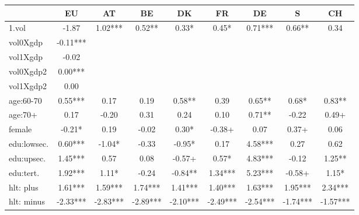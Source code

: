 {
\def\sym#1{\ifmmode^{#1}\else\(^{#1}\)\fi}
\begin{tabular}{l*{8}{c}}
\hline\hline
            &\multicolumn{1}{c}{EU}&\multicolumn{1}{c}{AT}&\multicolumn{1}{c}{BE}&\multicolumn{1}{c}{DK}&\multicolumn{1}{c}{FR}&\multicolumn{1}{c}{DE}&\multicolumn{1}{c}{S}&\multicolumn{1}{c}{CH}\\
\hline
1.vol       &       -1.87   &        1.02***&        0.52** &        0.33*  &        0.45*  &        0.71***&        0.66** &        0.34   \\
vol0Xgdp    &       -0.11***&               &               &               &               &               &               &               \\
vol1Xgdp    &       -0.02   &               &               &               &               &               &               &               \\
vol0Xgdp2   &        0.00***&               &               &               &               &               &               &               \\
vol1Xgdp2   &        0.00   &               &               &               &               &               &               &               \\
age:60-70   &        0.55***&        0.17   &        0.19   &        0.58** &        0.39   &        0.65** &        0.68*  &        0.83** \\
age:70+     &        0.17   &       -0.20   &        0.31   &        0.24   &        0.10   &        0.71** &       -0.22   &        0.49+  \\
female      &       -0.21*  &        0.19   &       -0.02   &        0.30*  &       -0.38+  &        0.07   &        0.37+  &        0.06   \\
edu:lowsec. &        0.60***&       -1.04*  &       -0.33   &       -0.95*  &        0.17   &        4.58***&        0.27   &        0.62   \\
edu:upsec.  &        1.45***&        0.57   &        0.08   &       -0.57+  &        0.57*  &        4.83***&       -0.12   &        1.25** \\
edu:tert.   &        1.92***&        1.11*  &       -0.24   &       -0.84** &        1.34***&        5.23***&       -0.58+  &        1.15*  \\
hlt: plus   &        1.61***&        1.59***&        1.74***&        1.41***&        1.40***&        1.63***&        1.95***&        2.34***\\
hlt: minus  &       -2.33***&       -2.83***&       -2.89***&       -2.10***&       -2.49***&       -2.54***&       -1.74***&       -1.57***\\

\end{tabular}}
